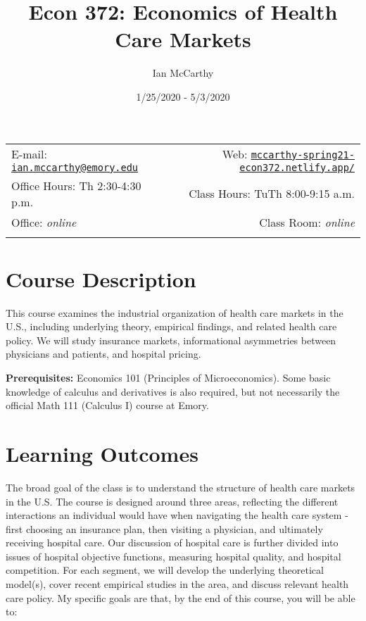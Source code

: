 \documentclass[11pt,]{article}
\title{Econ 372: Economics of Health Care Markets}
\author{Ian McCarthy}
\date{1/25/2020 - 5/3/2020}
\begin{document}
  

		\maketitle
		
	
		\thispagestyle{firststyle}



	\noindent \begin{tabular*}{\textwidth}{ @{\extracolsep{\fill}} lr @{\extracolsep{\fill}}}


E-mail: \texttt{\href{mailto:ian.mccarthy@emory.edu}{\nolinkurl{ian.mccarthy@emory.edu}}} & Web: \href{http://mccarthy-spring21-econ372.netlify.app/}{\tt mccarthy-spring21-econ372.netlify.app/}\\
Office Hours: Th 2:30-4:30 p.m.  &  Class Hours: TuTh 8:00-9:15 a.m.\\
Office: \emph{online}  & Class Room: \emph{online}\\
	&  \\
	\hline
	\end{tabular*}
	
\vspace{2mm}
	


\hypertarget{course-description}{%
\section{Course Description}\label{course-description}}

This course examines the industrial organization of health care markets
in the U.S., including underlying theory, empirical findings, and
related health care policy. We will study insurance markets,
informational asymmetries between physicians and patients, and hospital
pricing.

\textbf{Prerequisites:} Economics 101 (Principles of Microeconomics).
Some basic knowledge of calculus and derivatives is also required, but
not necessarily the official Math 111 (Calculus I) course at Emory.

\hypertarget{learning-outcomes}{%
\section{Learning Outcomes}\label{learning-outcomes}}

The broad goal of the class is to understand the structure of health
care markets in the U.S. The course is designed around three areas,
reflecting the different interactions an individual would have when
navigating the health care system - first choosing an insurance plan,
then visiting a physician, and ultimately receiving hospital care. Our
discussion of hospital care is further divided into issues of hospital
objective functions, measuring hospital quality, and hospital
competition. For each segment, we will develop the underlying
theoretical model(s), cover recent empirical studies in the area, and
discuss relevant health care policy. My specific goals are that, by the
end of this course, you will be able to:
\end{document}
